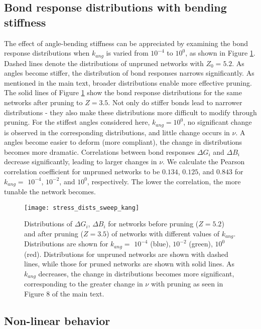 \documentclass[9pt,twocolumn,twoside]{pnas-new}
\begin{document}
\subsection*{Bond response distributions with bending stiffness}
The effect of angle-bending stiffness can be appreciated by examining the bond response distributions when $k_{ang}$ is varied from $10^{-4}$ to $10^{0}$, as shown in Figure \ref{fig:stressDistsPrune}.  Dashed lines denote the distributions of unpruned networks with $Z_{0}=5.2$.  As angles become stiffer, the distribution of bond responses narrows significantly.  As mentioned in the main text, broader distributions enable more effective pruning.  The solid lines of Figure \ref{fig:stressDistsPrune} show the bond response distributions for the same networks after pruning to $Z=3.5$.  Not only do stiffer bonds lead to narrower distributions - they also make these distributions more difficult to modify through pruning. For the stiffest angles considered here, $k_{ang}=10^{0}$, no significant change is observed in the corresponding distributions, and little change occurs in $\nu$.  A angles become easier to deform (more compliant), the change in distributions becomes more dramatic. Correlations between bond responses $\Delta G_{i}$ and $\Delta B_{i}$ decrease significantly, leading to larger changes in $\nu$. We calculate the Pearson correlation coefficient for unpruned networks to be $0.134$, $0.125$, and $0.843$ for $k_{ang}=$ $10^{-4}$, $10^{-2}$, and $10^{0}$, respectively.  The lower the correlation, the more tunable the network becomes. 

\begin{figure}[h]
	\centering
	\texttt{[image: stress\_dists\_sweep\_kang]}
	\caption{Distributions of $\Delta G_{i}$, $\Delta B_{i}$ for networks before pruning ($Z=5.2$) and after pruning ($Z=3.5$) of networks with different values of $k_{ang}$.  Distributions are shown for $k_{ang}=$ $10^{-4}$ (blue), $10^{-2}$ (green), $10^{0}$ (red).  Distributions for unpruned networks are shown with dashed lines, while those for pruned networks are shown with solid lines.  As $k_{ang}$ decreases, the change in distributions becomes more significant, corresponding to the greater change in $\nu$ with pruning as seen in Figure 8 of the main text. }
	\label{fig:stressDistsPrune}
\end{figure}


\subsection*{Non-linear behavior}
\end{document}
